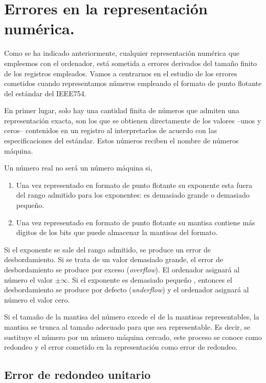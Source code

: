 \section{Errores en la representación numérica.}

Como se ha indicado anteriormente, cualquier representación numérica que empleemos con el ordenador, está sometida a errores derivados del tamaño finito de los registros empleados. Vamos a centrarnos en el estudio de los errores cometidos cuando representamos números empleando el formato de punto flotante del estándar del IEEE754.

En primer lugar, solo hay una cantidad finita de números que admiten una representación exacta, son los que se obtienen directamente de los valores --unos y ceros-- contenidos en un registro al interpretarlos de acuerdo con las especificaciones del estándar. Estos números reciben el nombre de números máquina. 

Un número real no será un número máquina si, 

\begin{enumerate}
\item Una vez representado en formato de punto flotante su exponente esta fuera del rango admitido para los exponentes: es demasiado grande o demasiado pequeño.

\item Una vez representado en formato de punto flotante su mantisa contiene más dígitos de los bits que puede almacenar la mantisas del formato. 
\end{enumerate}
 
Si el exponente se sale del rango admitido, se produce un error de desbordamiento. Si se trata de un valor demasiado grande, el error de desbordamiento se produce por exceso (\emph{overflow}). El ordenador asignará al número el valor $\pm \infty$. Si el exponente es demasiado pequeño , entonces el desbordamiento se produce por defecto (\emph{underflow}) y el ordenador asignará al número el valor cero.

Si el tamaño de la mantisa del número excede el de la mantisas representables, la mantisa se trunca al tamaño adecuado para que sea representable. Es decir, se sustituye el número por un número máquina cercado, este proceso se conoce como redondeo y el error cometido en la representación como error de redondeo.

\subsection{Error de redondeo unitario} 


